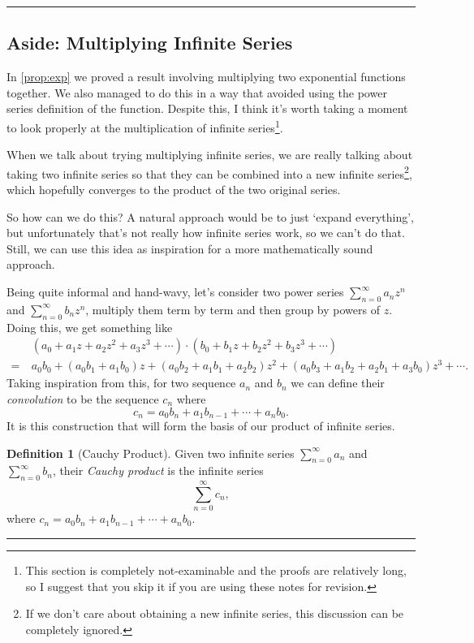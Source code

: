 \documentclass[11pt, a4paper]{article}
\theoremstyle{definition}
\newtheorem*{definition*}{Definition}
\newenvironment{aside}[1]{
	\noindent
    \rule{\textwidth}{0.025cm}
    \vspace{-1.75\baselineskip}
    \subsection*{#1}}
{\noindent\rule{\textwidth}{0.025cm}}
\newcommand{\vocab}[1]{\emph{#1}} %
\begin{document}
\begin{aside}{Aside: Multiplying Infinite Series}

In \autoref{prop:exp} we proved a result involving multiplying two exponential functions together. We also managed to do this in a way that avoided using the power series definition of the function. Despite this, I think it's worth taking a moment to look properly at the multiplication of infinite series\footnote{This section is completely not-examinable and the proofs are relatively long, so I suggest that you skip it if you are using these notes for revision.}.

When we talk about trying multiplying infinite series, we are really talking about taking two infinite series so that they can be combined into a new infinite series\footnote{If we don't care about obtaining a new infinite series, this discussion can be completely ignored.}, which hopefully converges to the product of the two original series.

So how can we do this? A natural approach would be to just `expand everything', but unfortunately that's not really how infinite series work, so we can't do that. Still, we can use this idea as inspiration for a more mathematically sound approach. 

Being quite informal and hand-wavy, let's consider two power series $\sum_{n = 0}^{\infty} a_n z^n$ and $\sum_{n = 0}^{\infty} b_n z^n$, multiply them term by term and then group by powers of $z$. Doing this, we get something like 
\begin{align*}
	&(a_0 + a_1 z + a_2 z^2 + a_3 z^3 + \cdots) \cdot (b_0 + b_1 z + b_2 z^2 + b_3z^3 + \cdots)\\
	=\ & a_0 b_0 + (a_0 b_1 + a_1 b_0) z + (a_0 b_2 + a_1 b_1 + a_2 b_2) z^2 + (a_0 b_3 + a_1 b_2 + a_2 b_1 + a_3 b_0) z^3 + \cdots.
\end{align*}
Taking inspiration from this, for two sequence $a_n$ and $b_n$ we can define their \vocab{convolution} to be the sequence $c_n$ where
$$
	c_n = a_0 b_n + a_1 b_{n - 1} + \cdots + a_n b_0.
$$
It is this construction that will form the basis of our product of infinite series.

\begin{definition*}[Cauchy Product]
	Given two infinite series $\sum_{n = 0}^{\infty} a_n$ and $\sum_{n = 0}^{\infty} b_n$, their \vocab{Cauchy product} is the infinite series
	$$
	\sum_{n = 0}^{\infty} c_n,
	$$
	where $c_n = a_0 b_n + a_1 b_{n - 1} + \cdots + a_n b_0$.
\end{definition*}


\end{aside}
\end{document}
